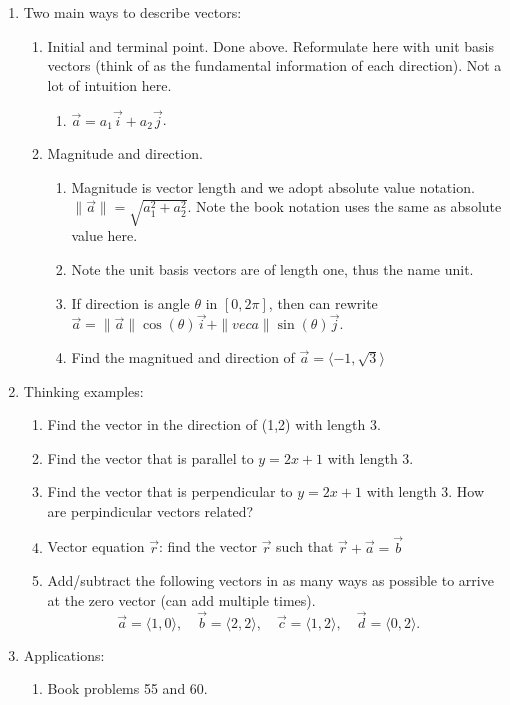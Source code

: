 \documentclass{article}
\begin{document}
\begin{enumerate}
\item Two main ways to describe vectors: 
\begin{enumerate}
\item Initial and terminal point. Done above. Reformulate here with unit basis vectors (think of as the fundamental information of each direction). Not a lot of intuition here. 
\begin{enumerate}
\item $ \vec{a}  = a_1 \vec{i} + a_2 \vec{j}$.
\end{enumerate}
\item Magnitude and direction.
\begin{enumerate}
\item Magnitude is vector length and we adopt absolute value notation. $\| \vec{a} \| = \sqrt{a_1^2 + a_2^2}$. Note the book notation uses the same as absolute value here.
\item Note the unit basis vectors are of length one, thus the name unit.
\item If direction is angle $\theta$ in $[0,2\pi]$, then can rewrite $\vec{a} = \|\vec{a}\| \cos(\theta) \vec{i} + \|vec{a}\| \sin(\theta) \vec{j}$.
\item Find the magnitued and direction of $\vec{a}=\langle-1,\sqrt{3}\rangle$
\end{enumerate}
\end{enumerate}

\item Thinking examples:
\begin{enumerate}
\item Find the vector in the direction of (1,2) with length 3.
\item Find the vector that is parallel to $y = 2x+1$ with length 3.
\item Find the vector that is perpendicular to $y = 2x+1$ with length 3. How are perpindicular vectors related?
\item Vector equation $\vec r$: find the vector $\vec r$ such that $\vec r+\vec a = \vec b$
\item Add/subtract the following vectors in as many ways as possible to arrive at the zero vector (can add multiple times).
\[
\vec{a} = \langle 1,0 \rangle, \quad
\vec{b} = \langle 2,2 \rangle, \quad
\vec{c} = \langle 1,2 \rangle, \quad
\vec{d} = \langle 0,2 \rangle. \quad
\]
\end{enumerate}

\item Applications:
\begin{enumerate}
\item Book problems 55 and 60.
\end{enumerate}


\end{enumerate}
\end{document}
